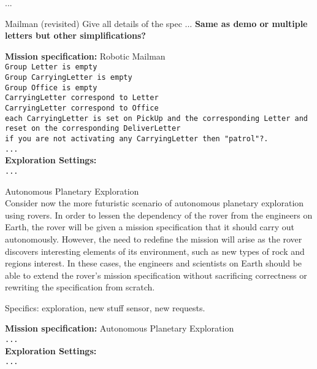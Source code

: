 ...

\begin{myExample}\label{Ex:mailman3} Mailman (revisited)
	Give all details of the spec ... \textbf{Same as demo or multiple letters but other simplifications?}
\end{myExample}

\begin{algorithm}
	\textbf{Mission specification:} Robotic Mailman\\
	{\small
	\texttt{Group Letter is empty}\\
	\texttt{Group CarryingLetter is empty}\\
	\texttt{Group Office is empty}\\
	\texttt{CarryingLetter correspond to Letter}\\
	\texttt{CarryingLetter correspond to Office}\\
	\texttt{each CarryingLetter is set on PickUp and the corresponding Letter and reset on the corresponding DeliverLetter}\\
	
	\texttt{if you are not activating any CarryingLetter then "patrol"?.}\\
	\texttt{...}\\
	}
	\textbf{Exploration Settings:}\\
	{\small
	\texttt{...} 
	}
\end{algorithm}

\begin{myExample}\label{Ex:planetxplore} Autonomous Planetary Exploration\\
	Consider now the more futuristic scenario of autonomous planetary exploration using rovers. In order to lessen the dependency of the rover from the engineers on Earth, the rover will be given a mission specification that it should carry out autonomously. However, the need to redefine the mission will arise as the rover discovers interesting elements of its environment, such as new types of rock and regions interest. In these cases, the engineers and scientists on Earth should be able to extend the rover's mission specification without sacrificing correctness or rewriting the specification from scratch.
	
	Specifics: exploration, new stuff sensor, new requests.
\end{myExample}

\begin{algorithm}
	\textbf{Mission specification:} Autonomous Planetary Exploration\\
	{\small
	\texttt{...}\\
	}
	\textbf{Exploration Settings:}\\
	{\small
	\texttt{...} 
	}
\end{algorithm}

